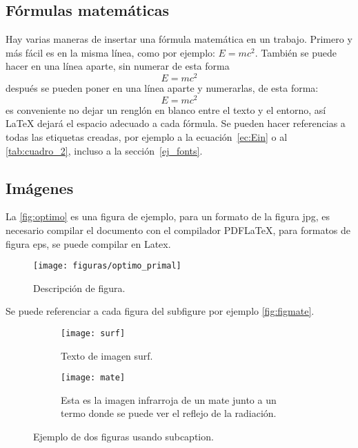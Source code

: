 \documentclass[a4paper,11pt]{article}
\begin{document}
\subsection{Fórmulas matemáticas}
Hay varias maneras de insertar una fórmula matemática en un trabajo. Primero y más fácil es en la misma línea, como por ejemplo: $E=mc^{2}$. También se puede hacer en una línea aparte, sin numerar de esta forma $$E=mc^{2}$$ después se pueden poner en una línea aparte y numerarlas, de esta forma: 
\begin{equation}\label{ec:Ein}
  E=mc^{2}
\end{equation} %
%
es conveniente no dejar un renglón en blanco entre el texto y el entorno, así LaTeX dejará el espacio adecuado a cada fórmula. Se pueden hacer referencias a todas las etiquetas creadas, por ejemplo a la ecuación~\eqref{ec:Ein} o al \autoref{tab:cuadro_2}, incluso a la sección~\ref{ej_fonts}.


\subsection{Imágenes}
%
La \autoref{fig:optimo} es una figura de ejemplo, para un formato de la figura jpg, es necesario compilar el documento con el compilador PDFLaTeX, para formatos de figura eps, se puede compilar en Latex.
\begin{figure}[h!]
\centering
\texttt{[image: figuras/optimo\_primal]}
\caption{Descripción de figura.}
\label{fig:optimo}
\end{figure}


Se puede referenciar a cada figura del subfigure por ejemplo \autoref{fig:figmate}.

\begin{figure}[htb]
  \begin{subfigure}[t]{.6\linewidth}
	\centering
	\texttt{[image: surf]}
	\caption{Texto de imagen surf.}\label{fig:figsurf}
  \end{subfigure}%
  \begin{subfigure}[t]{.4\linewidth}
	\centering
	\texttt{[image: mate]}
	\caption{Esta es la imagen infrarroja de un mate junto a un termo donde se puede ver el reflejo de la radiación.}\label{fig:figmate}
  \end{subfigure}
\caption{Ejemplo de dos figuras usando subcaption.}
\label{fig:mapasej1_CECENR}
\end{figure}
\end{document}
